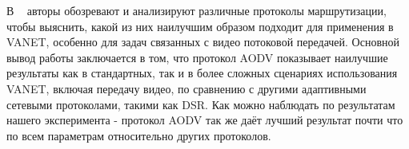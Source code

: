 В ~\cite{rizwan2018vanet} авторы обозревают и анализируют различные протоколы маршрутизации, чтобы выяснить, какой из них наилучшим образом подходит для применения в VANET, особенно для задач связанных с видео потоковой передачей. Основной вывод работы заключается в том, что протокол AODV показывает наилучшие результаты как в стандартных, так и в более сложных сценариях использования VANET, включая передачу видео, по сравнению с другими адаптивными сетевыми протоколами, такими как DSR. Как можно наблюдать по результатам нашего эксперимента - протокол AODV так же даёт лучший результат почти что по всем параметрам относительно других протоколов.